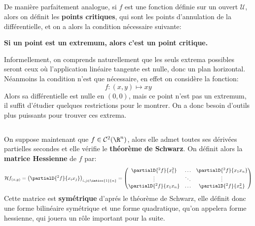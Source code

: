 \subsection*{}
De manière parfaitement analogue, si \(f\) est une fonction définie sur un ouvert \(\mathcal{U}\), alors on définit les \textbf{points critiques}, qui sont les points d'annulation de la différentielle, et on a alors la condition nécessaire suivante:
\begin{center}
   \textbf{Si un point est un extremum, alors c'est un point critique.}
\end{center}
Informellement, on comprends naturellement que les seuls extrema possibles seront ceux où l'application linéaire tangente est nulle, donc un plan horizontal. Néanmoins la condition n'est que nécessaire, en effet on considère la fonction:
\[
   f : (x, y) \mapsto xy   
\]
Alors sa différentielle est nulle en \((0, 0)\), mais ce point n'est pas un extremum, il suffit d'étudier quelques restrictions pour le montrer. On a donc besoin d'outils plus puissants pour trouver ces extrema. 
\subsection*{}
On suppose maintenant que \(f \in \mathcal{C}^2(\R^n)\), alors elle admet toutes ses dérivées partielles secondes et elle vérifie le \textbf{théorème de Schwarz}. On définit alors la \textbf{matrice Hessienne} de \(f\) par:
\[
   \mathcal{H}f_{(x, y)} = \left(\partialD{{}^2f}{x_ix_j}\right)_{i ,j \in \inticc{1}{n}} = 
   \begin{pmatrix}
      \partialD{{}^2f}{x_1^2} & \ldots & \partialD{{}^2f}{x_1x_{n}}\\ 
      \vdots & \ddots & \vdots\\ 
      \partialD{{}^2f}{x_{1}x_n} & \ldots & \partialD{{}^2f}{x_{n}^2}\\   
   \end{pmatrix}   
\]
Cette matrice est \textbf{symétrique} d'aprés le théorème de Schwarz, elle définit donc une forme bilinéaire symétrique et une forme quadratique, qu'on appelera forme hessienne, qui jouera un rôle important pour la suite.
